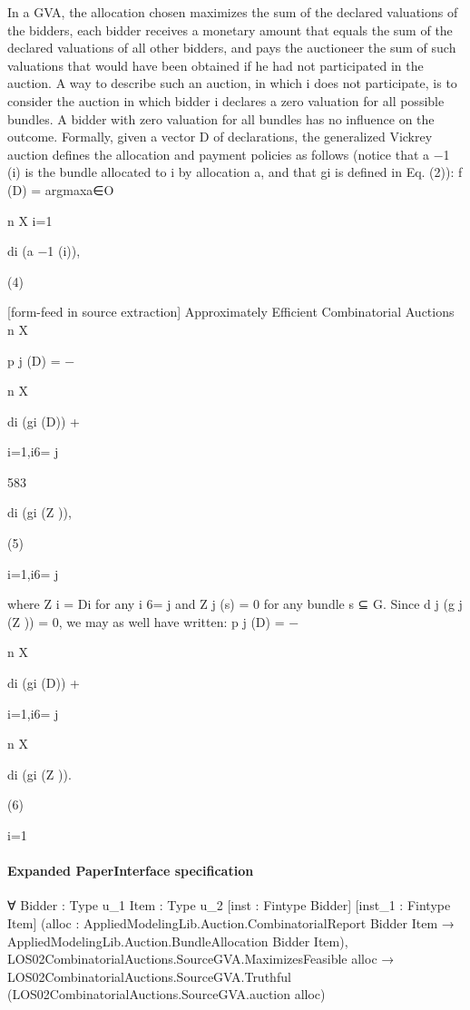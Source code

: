 \documentclass[10pt]{article}
\begin{document}
\begin{ReviewVerbatim}

In a GVA, the allocation chosen maximizes the sum of the declared valuations
of the bidders, each bidder receives a monetary amount that equals the sum of the
declared valuations of all other bidders, and pays the auctioneer the sum of such
valuations that would have been obtained if he had not participated in the auction.
A way to describe such an auction, in which i does not participate, is to consider
the auction in which bidder i declares a zero valuation for all possible bundles. A
bidder with zero valuation for all bundles has no influence on the outcome.
Formally, given a vector D of declarations, the generalized Vickrey auction
defines the allocation and payment policies as follows (notice that a −1 (i) is the
bundle allocated to i by allocation a, and that gi is defined in Eq. (2)):
f (D) = argmaxa∈O

n
X
i=1

di (a −1 (i)),

(4)


[form-feed in source extraction]
Approximately Efficient Combinatorial Auctions
n
X

p j (D) = −

n
X

di (gi (D)) +

i=1,i6= j

583

di (gi (Z )),

(5)

i=1,i6= j

where Z i = Di for any i 6= j and Z j (s) = 0 for any bundle s ⊆ G. Since
d j (g j (Z )) = 0, we may as well have written:
p j (D) = −

n
X

di (gi (D)) +

i=1,i6= j

n
X

di (gi (Z )).

(6)

i=1
\end{ReviewVerbatim}



\paragraph{Expanded PaperInterface specification}
\begin{ReviewVerbatim}
∀ {Bidder : Type u_1} {Item : Type u_2} [inst : Fintype Bidder] [inst_1 : Fintype Item]
  (alloc :
    AppliedModelingLib.Auction.CombinatorialReport Bidder Item →
      AppliedModelingLib.Auction.BundleAllocation Bidder Item),
  LOS02CombinatorialAuctions.SourceGVA.MaximizesFeasible alloc →
    LOS02CombinatorialAuctions.SourceGVA.Truthful (LOS02CombinatorialAuctions.SourceGVA.auction alloc)
\end{ReviewVerbatim}
\end{document}
